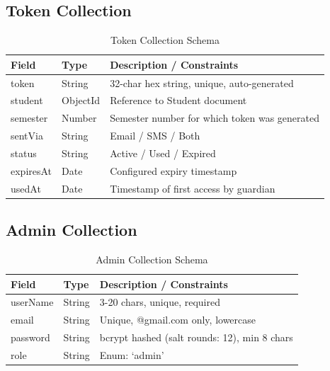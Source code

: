 \documentclass[12pt,a4paper]{report}
\begin{document}
\subsection{Token Collection}
\begin{table}[H]
\centering
\caption{Token Collection Schema}
\renewcommand{\arraystretch}{1.3}
\begin{tabular}{|l|l|p{7cm}|}
\hline
\textbf{Field} & \textbf{Type} & \textbf{Description / Constraints}\\
\hline
token & String & 32-char hex string, unique, auto-generated\\
\hline
student & ObjectId & Reference to Student document\\
\hline
semester & Number & Semester number for which token was generated\\
\hline
sentVia & String & Email / SMS / Both\\
\hline
status & String & Active / Used / Expired\\
\hline
expiresAt & Date & Configured expiry timestamp\\
\hline
usedAt & Date & Timestamp of first access by guardian\\
\hline
\end{tabular}
\end{table}

\subsection{Admin Collection}
\begin{table}[H]
\centering
\caption{Admin Collection Schema}
\renewcommand{\arraystretch}{1.3}
\begin{tabular}{|l|l|p{7cm}|}
\hline
\textbf{Field} & \textbf{Type} & \textbf{Description / Constraints}\\
\hline
userName & String & 3-20 chars, unique, required\\
\hline
email & String & Unique, @gmail.com only, lowercase\\
\hline
password & String & bcrypt hashed (salt rounds: 12), min 8 chars\\
\hline
role & String & Enum: `admin'\\
\hline
\end{tabular}
\end{table}
\end{document}
